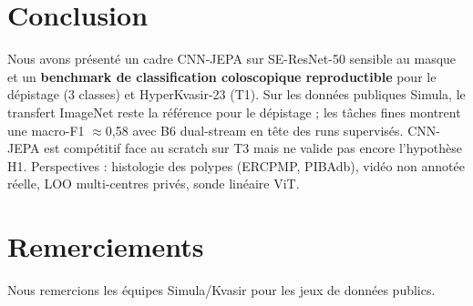 \section{Conclusion}
\label{sec:conclusion}

Nous avons présenté un cadre CNN-JEPA sur SE-ResNet-50 sensible au masque et un \textbf{benchmark de classification coloscopique reproductible} pour le dépistage (3 classes) et HyperKvasir-23 (T1).
Sur les données publiques Simula, le transfert ImageNet reste la référence pour le dépistage ; les tâches fines montrent une macro-F1 $\approx$0,58 avec B6 dual-stream en tête des runs supervisés.
CNN-JEPA est compétitif face au scratch sur T3 mais ne valide pas encore l'hypothèse H1.
Perspectives : histologie des polypes (ERCPMP, PIBAdb), vidéo non annotée réelle, LOO multi-centres privés, sonde linéaire ViT.

\section*{Remerciements}
Nous remercions les équipes Simula/Kvasir pour les jeux de données publics.
